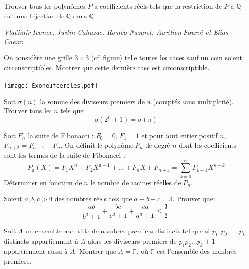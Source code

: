 \begin{exo}{}
Trouver tous les polynômes $P$ a coefficients réels tels que la restriction de $P$ à $\mathbb{Q}$ soit une bijection de $\mathbb{Q}$ dans $\mathbb{Q}$.

\medskip
\textit{Vladimir Ivanov, Justin Cahuzac, Roméo Nazaret, Aurélien Fourré et Elias Caeiro}

\end{exo}

\begin{exo}{}
On considère une grille $3\times 3$ (cf. figure) telle toutes les cases sauf un coin soient circonscriptibles. Montrer que cette dernière case est circonscriptible. \\~~\\
\texttt{[image: Exoneufcercles.pdf]}
\end{exo}


\begin{exo}{}
Soit $\sigma(n)$ la somme des diviseurs premiers de $n$ (comptés sans multiplcité). Trouver tous les $n$ tels que:
$$\sigma(2^n+1)=\sigma(n)$$
\end{exo}

\begin{exo}{}
Soit $F_n$ la suite de Fibonacci : $F_0=0$, $F_1=1$ et pour tout entier positif $n$, $F_{n+2}=F_{n+1}+F_n$.
On définit le polynôme $P_n$ de degré $n$ dont les coefficients sont les termes de la suite de Fibonacci :
$$P_n(X)= F_1X^n+F_2X^{n-1}+\ldots +F_nX+F_{n+1}=\sum_{k=0}^{n} F_{k+1}X^{n-k}$$
Déterminer en fonction de $n$ le nombre de racines réelles de $P_n$.
\end{exo}



\begin{exo}{}
Soient $a,b,c>0$ des nombres réels tels que $a+b+c=3$. Prouver que:
$$ \frac{ab}{b^{3}+1}+\frac{bc}{c^{3}+1}+\frac{ca}{a^{3}+1}\le\frac{3}{2}.$$
\end{exo}


\begin{exo}{}
Soit $A$ un ensemble non vide de nombres premiers distincts tel que si $p_1,p_2,...,p_k$ distincts appartiennent à $A$ alors les diviseurs premiers de $p_1p_2...p_k+1$ appartiennent aussi à $A$. Montrer que $A=\mathbb{P}$, où $\mathbb{P}$  est l'ensemble des nombres premiers.
\end{exo}

